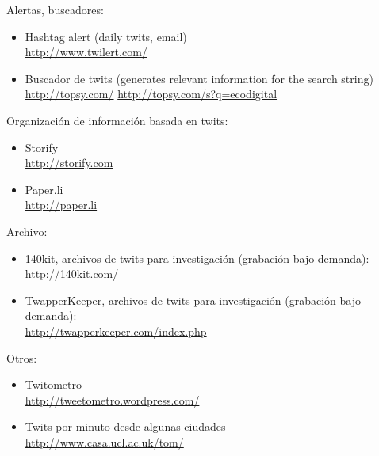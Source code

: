 \documentclass[a4paper,12pt]{article}
\begin{document}
Alertas, buscadores:

\begin{itemize}
\item Hashtag alert (daily twits, email) \\
  \url{http://www.twilert.com/}

\item Buscador de twits (generates relevant information for the search string) \\
  \url{http://topsy.com/} \url{http://topsy.com/s?q=ecodigital}
\end{itemize}

Organización de información basada en twits:

\begin{itemize}
\item Storify \\
  \url{http://storify.com}

\item Paper.li \\
  \url{http://paper.li}
\end{itemize}

Archivo:

\begin{itemize}
\item 140kit, archivos de twits para investigación (grabación bajo demanda): \\
  \url{http://140kit.com/}

\item TwapperKeeper, archivos de twits para investigación (grabación bajo demanda): \\
  \url{http://twapperkeeper.com/index.php}
\end{itemize}

Otros:

\begin{itemize}
\item Twitometro \\
  \url{http://tweetometro.wordpress.com/}

\item Twits por minuto desde algunas ciudades \\
  \url{http://www.casa.ucl.ac.uk/tom/}
\end{itemize}


\end{document}
